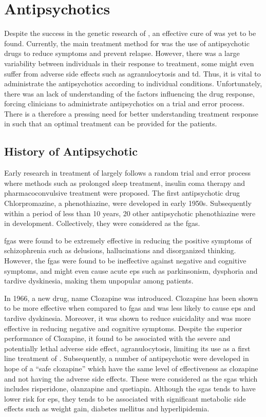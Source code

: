 	\section{Antipsychotics}
	Despite the success in the genetic research of , an effective cure of  was yet to be found.
	Currently, the main treatment method for  was the use of antipsychotic drugs to reduce symptoms and prevent relapse. 
	However, there was a large variability between individuals in their response to treatment, some might even suffer from adverse side effects such as agranulocytosis and \gls{td}.
	Thus, it is vital to administrate the antipsychotics according to individual conditions.
	Unfortunately, there was an lack of understanding of the factors influencing the drug response, forcing clinicians to administrate antipsychotics on a trial and error process.
	There is a therefore a pressing need for better understanding treatment response in  such that an optimal treatment can be provided for the patients.
	
	\subsection{History of Antipsychotic}
	Early research in treatment of  largely follows a random trial and error process where methods such as prolonged sleep treatment, insulin coma therapy and pharmacoconvulsive treatment were proposed\citep{Lehmann1997}.
	The first antipsychotic drug Chlorpromazine, a phenothiazine, were developed in early 1950s.
	Subsequently within a period of less than 10 years, 20 other antipsychotic phenothiazine were in development.
	Collectively, they were considered as the \glspl{fga}.
	
	\glspl{fga} were found to be extremely effective in reducing the positive symptoms of schizophrenia such as delusions, hallucinations and disorganized thinking.
	However, the \glspl{fga} were found to be ineffective against negative and cognitive symptoms, and might even cause acute \gls{eps} such as parkinsonism, dysphoria and tardive dyskinesia, making them unpopular among patients\citep{Tandon2007}.
	
	In 1966, a new drug, name Clozapine was introduced\citep{Lehmann1997}. 
	Clozapine has been shown to be more effective when compared to \glspl{fga} and was less likely to cause \gls{eps} and tardive dyskinesia.
	Moreover, it was shown to reduce suicidality and was more effective in reducing negative and cognitive symptoms\citep{Lehmann1997,Tandon2007}.
	Despite the superior performance of Clozapine, it found to be associated with the severe and potentially lethal adverse side effect, agranulocytosis\citep{Alvir1993}, limiting its use as a first line treatment of \citep{Remington2013}.
	Subsequently, a number of antipsychotic were developed in hope of a ``safe clozapine'' which have the same level of effectiveness as clozapine and not having the adverse side effects.
	These were considered as the \glspl{sga} which includes risperidone, olanzapine and quetiapin.
	Although the \glspl{sga} tends to have lower risk for \gls{eps}, they tends to be associated with significant metabolic side effects such as weight gain, diabetes mellitus and hyperlipidemia\citep{UCOK2008}.
	
